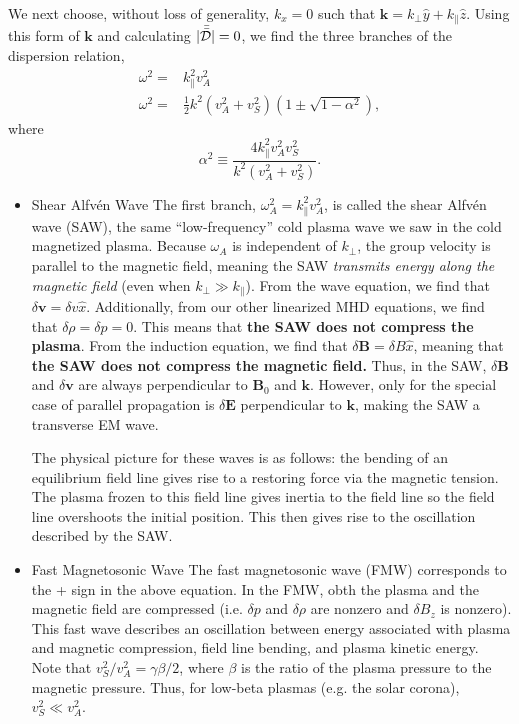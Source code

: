 	We next choose, without loss of generality, $k_x=0$ such that $\mathbf{k} = k_{\perp}\hat{y} + k_{\parallel}\hat{z}$. Using this form of $\mathbf{k}$ and calculating $|\bar{\bar{\mathcal{D}}}| = 0$, we find the three branches of the dispersion relation,
	\begin{align}
		\omega^2 =& k_{\parallel}^2v_A^2 \\
		\omega^2 =& \frac{1}{2}k^2(v_A^2 + v_S^2)(1 \pm \sqrt{1 - \alpha^2}),
	\end{align}
	where
	\begin{equation}
		\alpha^2\equiv\frac{4k_{\parallel}^2v_A^2v_S^2}{k^2(v_A^2 + v_S^2)}.
	\end{equation}

	\begin{itemize}

		\item{Shear Alfv\'en Wave}
		The first branch, $\omega_A^2=k_{\parallel}^2v_A^2$, is called the shear Alfv\'en wave (SAW), the same ``low-frequency'' cold plasma wave we saw in the cold magnetized plasma. Because $\omega_A$ is independent of $k_{\perp}$, the group velocity is parallel to the magnetic field, meaning the SAW \textit{transmits energy along the magnetic field} (even when $k_{\perp}\gg k_{\parallel}$). From the wave equation, we find that $\delta\mathbf{v}=\delta v\hat{x}$. Additionally, from our other linearized MHD equations, we find that $\delta\rho=\delta p = 0$. This means that \textbf{the SAW does not compress the plasma}. From the induction equation, we find that $\delta\mathbf{B}=\delta B\hat{x}$, meaning that \textbf{the SAW does not compress the magnetic field.} Thus, in the SAW, $\delta\mathbf{B}$ and $\delta\mathbf{v}$ are always perpendicular to $\mathbf{B}_0$ and $\mathbf{k}$. However, only for the special case of parallel propagation is $\delta\mathbf{E}$ perpendicular to $\mathbf{k}$, making the SAW a transverse EM wave.

		The physical picture for these waves is as follows: the bending of an equilibrium field line gives rise to a restoring force via the magnetic tension. The plasma frozen to this field line gives inertia to the field line so the field line overshoots the initial position. This then gives rise to the oscillation described by the SAW.

		\item{Fast Magnetosonic Wave}
		The fast magnetosonic wave (FMW) corresponds  to the + sign in the above equation. In the FMW, obth the plasma and the magnetic field are compressed (i.e. $\delta p$ and $\delta\rho$ are nonzero and $\delta B_z$ is nonzero). This fast wave describes an oscillation between energy associated with plasma and magnetic compression, field line bending, and plasma kinetic energy. Note that $v_S^2/v_A^2=\gamma\beta/2$, where $\beta$ is the ratio of the plasma pressure to the magnetic pressure. Thus, for low-beta plasmas (e.g. the solar corona), $v_S^2\ll v_A^2$. 


\end{itemize}

